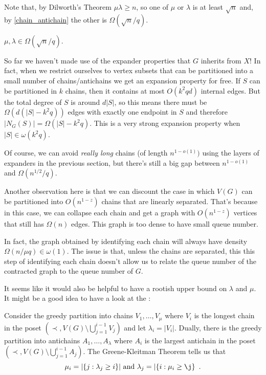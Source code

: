 \documentclass{patmorin}
\begin{document}
Note that, by Dilworth's Theorem $\mu\lambda \ge n$, so one of $\mu$ or $\lambda$ is at least $\sqrt{n}$ and, by \cref{chain_antichain} the other is $\Omega(\sqrt{n}/q)$.

\begin{cor}
  $\mu, \lambda \in \Omega(\sqrt{n}/q)$.
\end{cor}

So far we haven't made use of the expander properties that $G$ inherits from $X$!  In fact, when we restrict ourselves to vertex subsets that can be partitioned into a small number of chains/antichains we get an expansion property for free.  If $S$ can be partitioned in $k$ chains, then it contains at most $O(k^2qd)$ internal edges.  But the total degree of $S$ is around $d|S|$, so this means there must be $\Omega(d(|S|-k^2q))$ edges with exactly one endpoint in $S$ and therefore $|N_G(S)| = \Omega(|S|-k^2q)$.  This is a very strong expansion property when $|S|\in\omega(k^2q)$.

Of course, we can avoid \emph{really long} chains (of length $n^{1-o(1)})$ using the layers of expanders in the previous section, but there's still a big gap between $n^{1-o(1)}$ and $\Omega(n^{1/2}/q)$.

Another observation here is that we can discount the case in which $V(G)$ can be partitioned into $O(n^{1-z})$ chains that are linearly separated.  That's because in this case, we can collapse each chain and get a graph with $O(n^{1-z})$ vertices that still has $\Omega(n)$ edges.  This graph is too dense to have small queue number.

In fact, the graph obtained by identifying each chain will always have density $\Omega(n/\mu q)\in\omega(1)$.  The issue is that, unless the chains are separated, this this step of identifying each chain doesn't allow us to relate the queue number of the contracted graph to the queue number of $G$.

It seems like it would also be helpful to have a rootish upper bound on $\lambda$ and $\mu$.  It might be a good idea to have a look at the :

Consider the greedy partition into chains $V_1,\ldots,V_\mu$ where $V_i$ is the longest chain in the poset $(\prec,V(G)\setminus\bigcup_{j=1}^{i-1} V_j)$ and let $\lambda_i = |V_i|$.  Dually, there is the greedy partition into antichains $A_1,\ldots,A_{\lambda}$ where $A_i$ is the largest antichain in the poset $(\prec,V(G)\setminus\bigcup_{j=1}^{i-1}A_j)$.  The Greene-Kleitman Theorem tells us that
\[
    \mu_i = |\{j:\lambda_j \ge i\}| \mbox{ and }
    \lambda_j = |\{ i: \mu_i\ge \j\} \enspace .
\]
\end{document}
